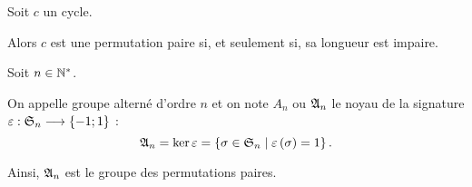 \begin{ex}[Piège]
Soit \(c\) un cycle.

Alors \(c\) est une permutation paire si, et seulement si, sa longueur est impaire.
\end{ex}

\begin{defi}
Soit \(n\in\mathbb{N}^*\).

On appelle groupe alterné d'ordre \(n\) et on note \(A_n\) ou \(\frak{A}_{n}\) le noyau de la signature \(\varepsilon:\frak{S}_{n}\longrightarrow\left\lbrace-1;1\right\rbrace\) : \[\frak{A}_{n}=\ker\varepsilon=\left\lbrace\sigma\in\frak{S}_{n}\;\middle|\;\varepsilon\left(\sigma\right)=1\right\rbrace.\]

Ainsi, \(\frak{A}_{n}\) est le groupe des permutations paires.
\end{defi}